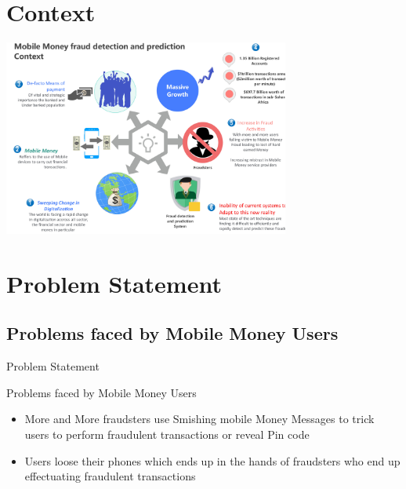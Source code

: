\documentclass[11pt,aspectratio=169]{beamer}
\begin{document}
	\section{Context}
		\begin{frame}
			 \begin{center}
			 	\includegraphics[width=\textwidth,height=183pt]{assets/context.jpg}
			 \end{center}
	
		\end{frame}

	\section{Problem Statement}
		\subsection{Problems faced by Mobile Money Users}
		
			\begin{frame}{Problem Statement}
			\begin{block}{Problems faced by Mobile Money Users}
					\begin{itemize}
						\item More and More fraudsters use Smishing mobile Money Messages to trick users to perform fraudulent transactions or reveal Pin code
						\item Users loose their phones which ends up in the hands of fraudsters who end up effectuating fraudulent transactions
					\end{itemize}
			\end{block}			
		\end{frame}	
	
\end{document}
